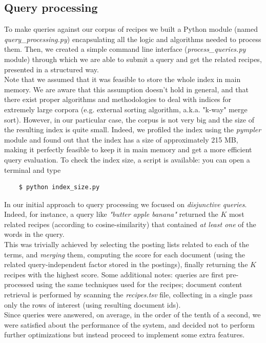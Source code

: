 \subsection{Query processing}

To make queries against our corpus of recipes we built a Python module (named \textit{query\_processing.py}) encapsulating all the logic and algorithms needed to process them. Then, we created a simple command line interface (\textit{process\_queries.py} module) through which we are able to submit a query and get the related recipes, presented in a structured way.\\
Note that we assumed that it was feasible to store the whole index in main memory. We are aware that this assumption doesn't hold in general, and that there exist proper algorithms and methodologies to deal with indices for extremely large corpora (e.g. external sorting algorithm, a.k.a. "k-way" merge sort). However, in our particular case, the corpus is not very big and the size of the resulting index is quite small. Indeed, we profiled the index using the \textit{pympler}\cite{pympler} module and found out that the index has a size of approximately 215 MB, making it perfectly feasible to keep it in main memory and get a more efficient query evaluation. To check the index size, a script is available: you can open a terminal and type
\begin{lstlisting}
	$ python index_size.py
\end{lstlisting}
In our initial approach to query processing we focused on \textit{disjunctive queries}. Indeed, for instance, a query like \textit{"butter apple banana"} returned the $K$ most related recipes (according to cosine-similarity) that contained \textit{at least one} of the words in the query. \\
This was trivially achieved by selecting the posting lists related to each of the terms, and \textit{merging} them, computing the score for each document (using the related query-independent factor stored in the postings), finally returning the $K$ recipes with the highest score. Some additional notes: queries are first pre-processed using the same techniques used for the recipes; document content retrieval is performed by scanning the \textit{recipes.tsv} file, collecting in a single pass only the rows of interest (using resulting document ids).\\
Since queries were answered, on average, in the order of the tenth of a second, we were satisfied about the performance of the system, and decided not to perform further optimizations but instead proceed to implement some extra features.


